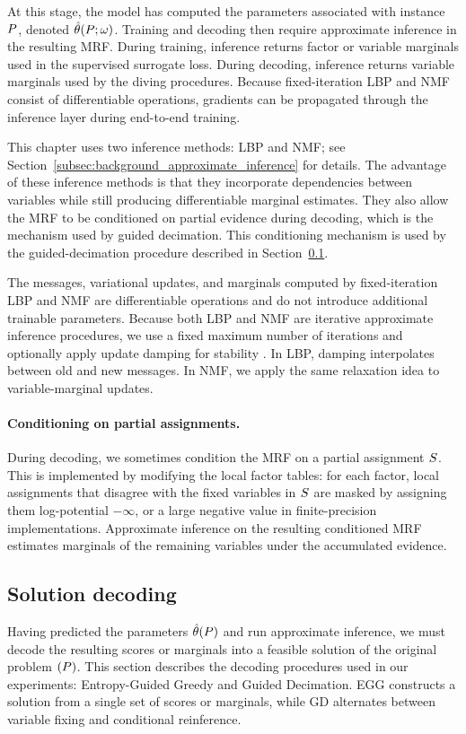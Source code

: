 At this stage, the model has computed the parameters associated with instance $P$, denoted $\hat{\theta}(P;\omega)$. Training and decoding then require approximate inference in the resulting MRF. During training, inference returns factor or variable marginals used in the supervised surrogate loss. During decoding, inference returns variable marginals used by the diving procedures. Because fixed-iteration LBP and NMF consist of differentiable operations, gradients can be propagated through the inference layer during end-to-end training.

This chapter uses two inference methods: LBP and NMF; see Section~\ref{subsec:background_approximate_inference} for details. The advantage of these inference methods is that they incorporate dependencies between variables while still producing differentiable marginal estimates. They also allow the MRF to be conditioned on partial evidence during decoding, which is the mechanism used by guided decimation. This conditioning mechanism is used by the guided-decimation procedure described in Section~\ref{subsubsec:chapter_3_egg_gd}.

The messages, variational updates, and marginals computed by fixed-iteration LBP and NMF are differentiable operations and do not introduce additional trainable parameters. Because both LBP and NMF are iterative approximate inference procedures, we use a fixed maximum number of iterations and optionally apply update damping for stability \cite{heskes_uniqueness_2004,wainwright_graphical_2007,meltzer_convergent_2012}. In LBP, damping interpolates between old and new messages. In NMF, we apply the same relaxation idea to variable-marginal updates. 

\paragraph{Conditioning on partial assignments.} During decoding, we sometimes condition the MRF on a partial assignment $S$. This is implemented by modifying the local factor tables: for each factor, local assignments that disagree with the fixed variables in $S$ are masked by assigning them log-potential $-\infty$, or a large negative value in finite-precision implementations. Approximate inference on the resulting conditioned MRF estimates marginals of the remaining variables under the accumulated evidence.

\subsection{Solution decoding}
\label{subsubsec:chapter_3_egg_gd}
Having predicted the parameters $\hat{\theta}(P)$ and run approximate inference, we must decode the resulting scores or marginals into a feasible solution of the original problem $(P)$. This section describes the decoding procedures used in our experiments: Entropy-Guided Greedy and Guided Decimation. EGG constructs a solution from a single set of scores or marginals, while GD alternates between variable fixing and conditional reinference.

